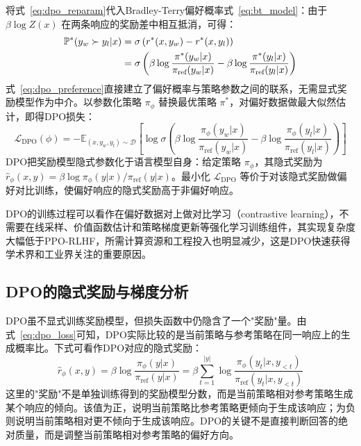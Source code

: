 将式~\eqref{eq:dpo_reparam}代入Bradley-Terry偏好概率式~\eqref{eq:bt_model}：由于 $\beta \log Z(x)$ 在两条响应的奖励差中相互抵消，可得：
\begin{align}
    \mathbb{P}^*(y_w \succ y_l | x) &= \sigma\left(r^*(x,y_w) - r^*(x,y_l)\right) \notag \\
    &= \sigma\left(\beta \log \frac{\pi^*(y_w|x)}{\pi_{\text{ref}}(y_w|x)} - \beta \log \frac{\pi^*(y_l|x)}{\pi_{\text{ref}}(y_l|x)}\right)
    \label{eq:dpo_preference}
\end{align}
式~\eqref{eq:dpo_preference}直接建立了偏好概率与策略参数之间的联系，无需显式奖励模型作为中介。以参数化策略 $\pi_\phi$ 替换最优策略 $\pi^*$，对偏好数据做最大似然估计，即得DPO损失：
\begin{equation}
    \mathcal{L}_{\text{DPO}}(\phi) = -\mathbb{E}_{(x, y_w, y_l) \sim \mathcal{D}}\left[\log \sigma\left(\beta \log \frac{\pi_\phi(y_w|x)}{\pi_{\text{ref}}(y_w|x)} - \beta \log \frac{\pi_\phi(y_l|x)}{\pi_{\text{ref}}(y_l|x)}\right)\right]
    \label{eq:dpo_loss}
\end{equation}
DPO把奖励模型隐式参数化于语言模型自身：给定策略 $\pi_\phi$，其隐式奖励为 $\hat{r}_\phi(x,y) = \beta \log \pi_\phi(y|x)/\pi_{\text{ref}}(y|x)$。最小化 $\mathcal{L}_{\text{DPO}}$ 等价于对该隐式奖励做偏好对比训练，使偏好响应的隐式奖励高于非偏好响应。

DPO的训练过程可以看作在偏好数据对上做对比学习（contrastive learning），不需要在线采样、价值函数估计和策略梯度更新等强化学习训练组件，其实现复杂度大幅低于PPO-RLHF，所需计算资源和工程投入也明显减少，这是DPO快速获得学术界和工业界关注的重要原因\cite{rafailov2023direct}。

\subsection{DPO的隐式奖励与梯度分析}

DPO虽不显式训练奖励模型，但损失函数中仍隐含了一个"奖励"量。由式~\eqref{eq:dpo_loss}可知，DPO实际比较的是当前策略与参考策略在同一响应上的生成概率比。下式可看作DPO对应的隐式奖励：
\begin{equation}
    \hat{r}_\phi(x, y) = \beta \log \frac{\pi_\phi(y|x)}{\pi_{\text{ref}}(y|x)} = \beta \sum_{t=1}^{|y|} \log \frac{\pi_\phi(y_t | x, y_{<t})}{\pi_{\text{ref}}(y_t | x, y_{<t})}
    \label{eq:dpo_implicit_reward}
\end{equation}
这里的"奖励"不是单独训练得到的奖励模型分数，而是当前策略相对参考策略生成某个响应的倾向。该值为正，说明当前策略比参考策略更倾向于生成该响应；为负则说明当前策略相对更不倾向于生成该响应。DPO的关键不是直接判断回答的绝对质量，而是调整当前策略相对参考策略的偏好方向。

